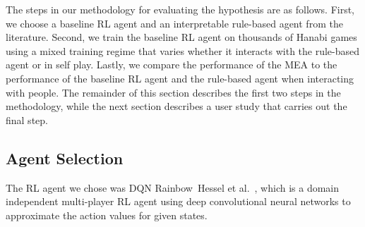 \documentclass[letterpaper]{article} %
\begin{document}



The steps in our methodology for evaluating the hypothesis are as follows. First, we choose a baseline  RL agent and an interpretable rule-based agent from the literature. %
Second,  
we train the baseline RL agent on  thousands of Hanabi games  using a mixed training regime that varies whether it interacts with the rule-based agent or in self play.  
Lastly, we compare the performance of the MEA to the performance of the baseline RL agent and the rule-based agent when interacting with people. The remainder of this section describes the 
first two steps in the methodology, while the next section describes a user study  that carries out  the  final step.

\subsection{Agent Selection}
The   RL agent we  chose was DQN Rainbow~Hessel et al.~,  which  is a domain independent multi-player RL agent using deep convolutional neural networks to approximate the action values for given states. 
\end{document}
